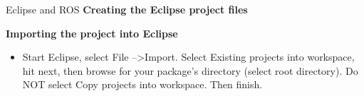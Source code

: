 \documentclass{beamer}
\begin{document}
\begin{frame}{Eclipse and ROS}
 \textbf{Creating the Eclipse project files}
 
 
 
 \textbf{Importing the project into Eclipse}
 \begin{itemize}
 \item Start Eclipse, select File  --\textgreater  Import. Select  Existing projects into workspace, hit next, then browse for your package's directory (select root directory). Do NOT select Copy projects into workspace. Then finish.
 \end{itemize}
\end{frame}
\end{document}

